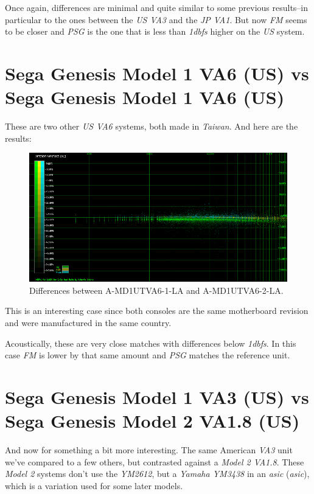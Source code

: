 \documentclass[10pt,a4paper]{report}
\newcommand{\define}[1]{\textit{\acrlong{#1}} (\textit{\acrshort{#1}})}
\newcommand{\db}[1]{\textit{\mbox{#1\acrshort{dbfs}}}}
\begin{document}
Once again, differences are minimal and quite similar to some previous results--in particular to the ones between the \textit{US VA3} and the \textit{JP VA1}. But now \textit{FM} seems to be closer and \textit{PSG} is the one that is less than \db{1} higher on the \textit{US} system.

\section{Sega Genesis Model 1 VA6 (US) vs\\ Sega Genesis Model 1 VA6 (US)}

These are two other \textit{US VA6} systems, both made in \textit{Taiwan}. And here are the results:

\begin{figure}[H]
	\centering
	\includegraphics[width=1.0\linewidth]{images/results/4-A-MD1UTVA6-1-LA_vs_A-MD1UTVA6-2-LA.png}
	\caption[A-MD1UTVA6-1-LA vs A-MD1UTVA6-2-LA]{Differences between A-MD1UTVA6-1-LA and A-MD1UTVA6-2-LA.}
	\label{fig:A-MD1UTVA6-1-LA_vs_A-MD1UTVA6-2-LA}
\end{figure}

This is an interesting case since both consoles are the same motherboard revision and were manufactured in the same country. 

Acoustically, these are very close matches with differences below \db{1}. In this case \textit{FM} is lower by that same amount and \textit{PSG} matches the reference unit.

\section{Sega Genesis Model 1 VA3 (US) vs\\ Sega Genesis Model 2 VA1.8 (US)}
\label{model2}

And now for something a bit more interesting. The same American \textit{VA3} unit we've compared to a few others, but contrasted against a \textit{Model 2 VA1.8}. These \textit{Model 2} systems don't use the \textit{YM2612}, but a \textit{Yamaha YM3438} in an \define{asic}, which is a variation used for some later models.
\end{document}

